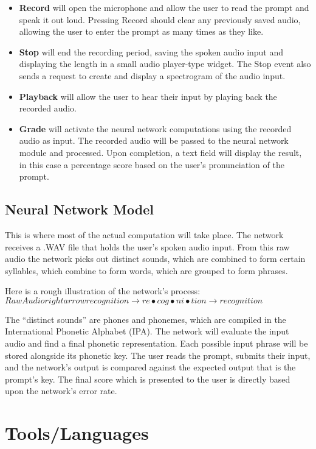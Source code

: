 \documentclass[12pt, letterpaper]{article}
\begin{document}
\begin{itemize}
  \item \textbf{Record} will open the microphone and allow the user to read the prompt and speak it out loud. Pressing Record should clear any previously saved audio, allowing the user to enter the prompt as many times as they like.
  \item \textbf{Stop} will end the recording period, saving the spoken audio input and displaying the length in a small audio player-type widget. The Stop event also sends a request to create and display a spectrogram of the audio input.
  \item \textbf{Playback} will allow the user to hear their input by playing back the recorded audio. 
  \item \textbf{Grade} will activate the neural network computations using the recorded audio as input. The recorded audio will be passed to the neural network module and processed. Upon completion, a text field will display the result, in this case a percentage score based on the user’s pronunciation of the prompt. 
\end{itemize}
\subsection{Neural Network Model}
This is where most of the actual computation will take place. The network receives a .WAV file that holds the user’s spoken audio input. From this raw audio the network picks out distinct sounds, which are combined to form certain syllables, which combine to form words, which are grouped to form phrases. 

Here is a rough illustration of the network’s process: 
$Raw Audio rightarrow r e c o g n i t i o n \rightarrow 
re\bullet cog\bullet ni\bullet tion \rightarrow recognition$

The “distinct sounds” are phones and phonemes, which are compiled in the International Phonetic Alphabet (IPA). 
The network will evaluate the input audio and find a final phonetic representation. Each possible input phrase will be stored alongside its phonetic key. The user reads the prompt, submits their input, and the network’s output is compared against the expected output that is the prompt’s key. The final score which is presented to the user is directly based upon the network’s error rate.


\section*{Tools/Languages}
\end{document}
